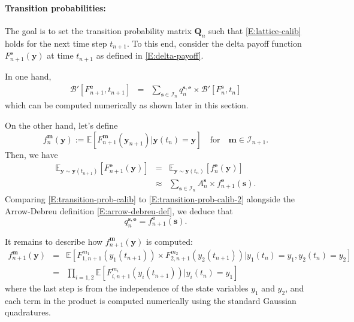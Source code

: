\documentclass{texyise}
\newcommand{\indexset}{\mathcal{I}}
\newcommand{\valuebackward}{\mathcal{B}}
\begin{document}
\paragraph*{Transition probabilities:}

The goal is to set the transition probability matrix $\bm{Q}_n$ such that \eqref{E:lattice-calib} holds for the next time step $t_{n+1}$. To this end, consider the delta payoff function $F_{n+1}^{\bm{e}}(\bm{y})$ at time $t_{n+1}$ as defined in \eqref{E:delta-payoff}. 

In one hand,
\begin{eqnarray}
    \valuebackward'[F_{n+1}^{\bm{e}}, t_{n+1}] & = & \sum_{\bm{s} \in \indexset_{n}} q_{n}^{\bm{s},\bm{e}} \times \valuebackward'[F_{n}^{\bm{s}}, t_{n}] \label{E:transition-prob-calib} 
\end{eqnarray}
which can be computed numerically as shown later in this section.

On the other hand, let's define 
\begin{equation}
    f_{n}^{\bm{m}}(\bm{y}) := \mathbb{E}[F_{n+1}^{\bm{m}}(\bm{y}_{n+1})|\bm{y}(t_n)=\bm{y}]
    \quad \text{for}\quad \bm{m} \in \indexset_{n+1}.
\end{equation}
Then, we have
\begin{eqnarray}
    \mathbb{E}_{\bm{y}\sim\bm{y}(t_{n+1})}\left[ F_{n+1}^{\bm{e}}(\bm{y}) \right] & = & 
    \mathbb{E}_{\bm{y}\sim\bm{y}(t_{n})}\left[ f_{n}^{\bm{e}}(\bm{y}) \right] \\
    & \approx & \sum_{\bm{s} \in \indexset_{n}} A_{n}^{\bm{s}} \times f_{n+1}^{\bm{e}}(\bm{s}).
    \label{E:transition-prob-calib-2}
\end{eqnarray}
Comparing \eqref{E:transition-prob-calib} to \eqref{E:transition-prob-calib-2} alongside the Arrow-Debreu definition \eqref{E:arrow-debreu-def}, we deduce that
\begin{equation}
    q_{n}^{\bm{s},\bm{e}} = f_{n+1}^{\bm{e}}(\bm{s}).
\end{equation}

It remains to describe how $f_{n+1}^{\bm{m}}(\bm{y})$ is computed: 
\begin{eqnarray}
f_{n+1}^{\bm{m}}(\bm{y}) & = & \mathbb{E} [F_{1,n+1}^{m_1}(y_1(t_{n+1})) \times F_{2,n+1}^{m_2}(y_2(t_{n+1}))| y_1(t_n) = y_1, y_2(t_n) = y_2] \label{E:green-1}\\
    & = & \prod_{i=1,2} \mathbb{E} [F_{i,n+1}^{m_i}(y_i(t_{n+1})) | y_i(t_n) = y_1] \label{E:green-2}
\end{eqnarray}
where the last step is from the independence of the state variables $y_1$ and $y_2$, and each term in the product is computed numerically using the standard Gaussian quadratures. 
\end{document}
